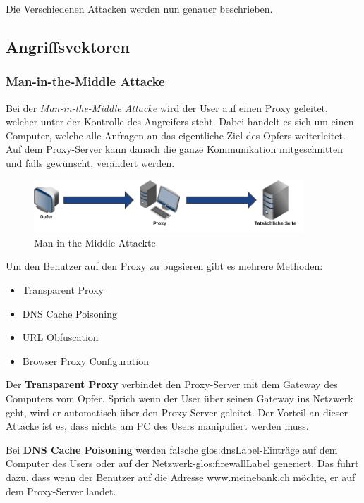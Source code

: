 Die Verschiedenen Attacken werden nun genauer beschrieben.

\subsection{Angriffsvektoren}

\subsubsection{Man-in-the-Middle Attacke}
Bei der \textit{Man-in-the-Middle Attacke} wird der User auf einen Proxy geleitet, welcher unter der Kontrolle des Angreifers steht. Dabei handelt es sich um einen Computer, welche alle Anfragen an das eigentliche Ziel des Opfers weiterleitet. Auf dem Proxy-Server kann danach die ganze Kommunikation mitgeschnitten und falls gewünscht, verändert werden.

\begin{figure}[H]
  \centering
  \includegraphics[width=0.9\textwidth]{images/man-in-the-middle-attacke.png}
  \caption{Man-in-the-Middle Attackte}
  \label{fig:phishing:angriffvorbereiten:attacken:maninthemiddleattacke}
\end{figure}

Um den Benutzer auf den Proxy zu bugsieren gibt es mehrere Methoden:
\begin{itemize}
\item Transparent Proxy
\item DNS Cache Poisoning
\item URL Obfuscation
\item Browser Proxy Configuration
\end{itemize}

Der \textbf{Transparent Proxy} verbindet den Proxy-Server mit dem Gateway des Computers vom Opfer. Sprich wenn der User über seinen Gateway ins Netzwerk geht, wird er automatisch über den Proxy-Server geleitet. Der Vorteil an dieser Attacke ist es, dass nichts am PC des Users manipuliert werden muss.

Bei \textbf{DNS Cache Poisoning} werden falsche \gls{glos:dnsLabel}-Einträge auf dem Computer des Users oder auf der Netzwerk-\gls{glos:firewallLabel} generiert. Das führt dazu, dass wenn der Benutzer auf die Adresse www.meinebank.ch möchte, er auf dem Proxy-Server landet.

